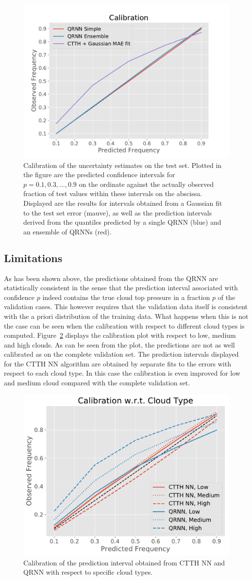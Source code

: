 \documentclass[journal abbreviation, manuscript]{copernicus}
\begin{document}
  \begin{figure}[hbpt!]
    \centering
    \includegraphics[width = 0.4\linewidth]{../plots/calibration_1}
    \caption{Calibration of the uncertainty estimates on the test set. Plotted in the
      figure are the predicted confidence intervals for $p = 0.1, 0.3, \ldots,
      0.9$ on the ordinate against the actually observed fraction of test values
      within these intervals on the abscissa. Displayed are the results for
      intervals obtained from a Gaussian fit to the test set error (mauve),
      as well as the prediction intervals derived from the quantiles predicted by a
      single QRNN (blue) and an ensemble of QRNNs (red).}
    \label{fig:calibration}
  \end{figure}

\subsection{Limitations}

As has been shown above, the predictions obtained from the QRNN are statistically
consistent in the sense that the prediction interval associated with confidence
$p$ indeed contains the true cloud top pressure in a fraction $p$ of the validation
cases. This however requires that the validation data itself is consistent with the
a priori distribution of the training data. What happens when this is not the case
can be seen when the calibration with respect to different cloud types is computed.
Figure~\ref{fig:calibration_cloud_type} displays the calibration plot with respect
to low, medium and high clouds. As can be seen from the plot, the predictions are
not as well calibrated as on the complete validation set.
The prediction intervals displayed for the CTTH NN algorithm are obtained by
separate fits to the errors with respect to each cloud type. In this case the
calibration is even improved for low and medium cloud compared with the
complete validation set.


  \begin{figure}[hbpt!]
    \centering
    \includegraphics[width = 0.4\linewidth]{../plots/calibration_cloud_type}
    \caption{Calibration of the prediction interval obtained from CTTH NN and QRNN
    with respect to specific cloud types.}
    \label{fig:calibration_cloud_type}
  \end{figure}
\end{document}
